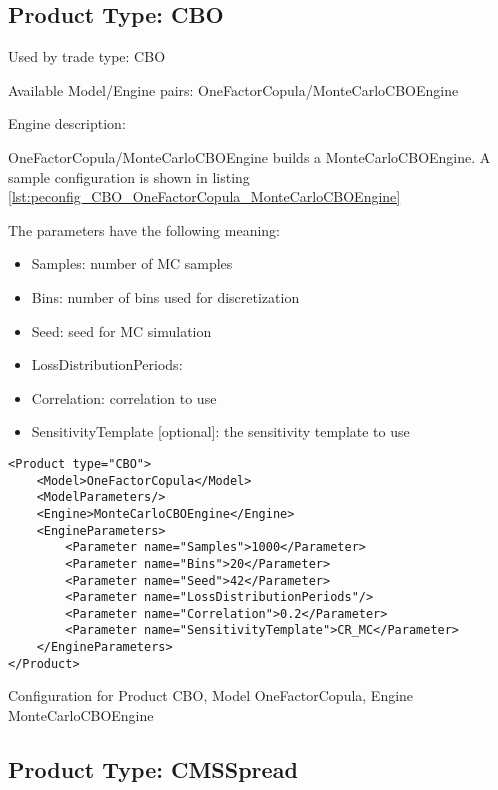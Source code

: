 \subsection{Product Type: CBO}

Used by trade type: CBO

Available Model/Engine pairs: OneFactorCopula/MonteCarloCBOEngine

Engine description:

OneFactorCopula/MonteCarloCBOEngine builds a MonteCarloCBOEngine. A sample configuration is shown in listing
\ref{lst:peconfig_CBO_OneFactorCopula_MonteCarloCBOEngine}

The parameters have the following meaning:

\begin{itemize}
\item Samples: number of MC samples
\item Bins: number of bins used for discretization
\item Seed: seed for MC simulation
\item LossDistributionPeriods:
\item Correlation: correlation to use
\item SensitivityTemplate [optional]: the sensitivity template to use   
\end{itemize}

\begin{longlisting}
\begin{verbatim}
<Product type="CBO">
    <Model>OneFactorCopula</Model>
    <ModelParameters/>
    <Engine>MonteCarloCBOEngine</Engine>
    <EngineParameters>
        <Parameter name="Samples">1000</Parameter>
        <Parameter name="Bins">20</Parameter>
        <Parameter name="Seed">42</Parameter>
        <Parameter name="LossDistributionPeriods"/>
        <Parameter name="Correlation">0.2</Parameter>
        <Parameter name="SensitivityTemplate">CR_MC</Parameter>
    </EngineParameters>
</Product>
\end{verbatim}
\caption{Configuration for Product CBO, Model OneFactorCopula, Engine MonteCarloCBOEngine}
\label{lst:peconfig_CBO_OneFactorCopula_MonteCarloCBOEngine}
\end{longlisting}

\subsection{Product Type: CMSSpread}

